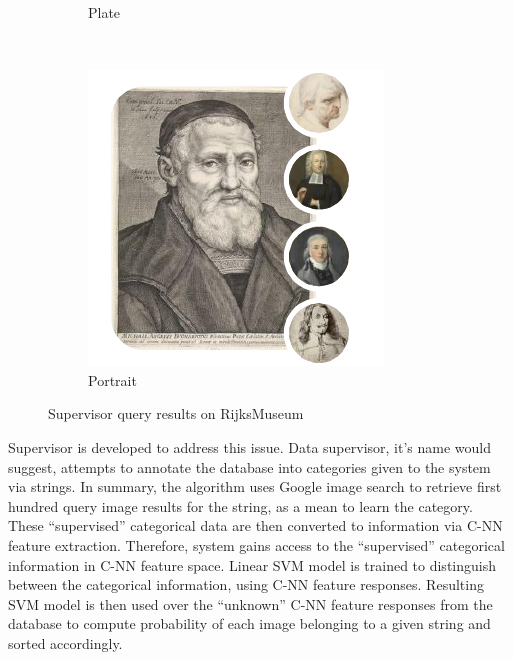 \documentclass[runningheads]{llncs}
\begin{document}
\begin{figure}
\begin{subfigure}[b]{0.3\textwidth}
		\caption{Plate}
		\label{fig:plate}
	\end{subfigure}
	~ %
	\begin{subfigure}[b]{0.3\textwidth}
		\includegraphics[width=\textwidth]{figures/data_supervisor/portrait}
		\caption{Portrait}
		\label{fig:portrait}
	\end{subfigure}
	\caption{Supervisor query results on RijksMuseum}\label{fig-dsupervisor}
\end{figure}


Supervisor is developed to address this issue. Data supervisor, it's name would suggest, attempts to annotate the database into categories given to the system via strings. In summary, the algorithm uses Google image search\cite{googleImage} to retrieve first hundred query image results for the string, as a mean to learn the category. These “supervised” categorical data are then converted to information via C-NN\cite{Chatfield14} feature extraction. Therefore, system gains access to the “supervised” categorical information in C-NN feature space. Linear SVM model\cite{CC01a} is trained to distinguish between the categorical information, using C-NN feature responses. Resulting SVM model is then used over the “unknown” C-NN feature responses from the database to compute probability of each image belonging to a given string and sorted accordingly.
\end{document}
